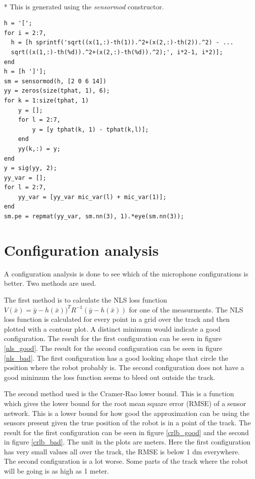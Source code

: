 \documentclass[10pt,a4paper]{report}
\begin{document}
\\*
This is generated using the \emph{sensormod} constructor.
\begin{verbatim}
h = '[';
for i = 2:7,
  h = [h sprintf('sqrt((x(1,:)-th(1)).^2+(x(2,:)-th(2)).^2) - ...
  sqrt((x(1,:)-th(%d)).^2+(x(2,:)-th(%d)).^2);', i*2-1, i*2)];
end
h = [h ']'];
sm = sensormod(h, [2 0 6 14])
yy = zeros(size(tphat, 1), 6);
for k = 1:size(tphat, 1)
    y = [];
    for l = 2:7,
        y = [y tphat(k, 1) - tphat(k,l)];
    end
    yy(k,:) = y;
end
y = sig(yy, 2);
yy_var = [];
for l = 2:7,
    yy_var = [yy_var mic_var(l) + mic_var(1)];
end
sm.pe = repmat(yy_var, sm.nn(3), 1).*eye(sm.nn(3));
\end{verbatim}



\newpage
\section{Configuration analysis}
\label{Configuration analysis}
A configuration analysis is done to see which of the microphone configurations is better.
Two methods are used.

The first method is to calculate the NLS loss function $V(\bar{x}) = \bar{y} - h(\bar{x}))^TR^{-1}(\bar{y} - h(\bar{x}))$ for one of the measurments.
The NLS loss function is calculated for every point in a grid over the track and then plotted with a contour plot.
A distinct minimum would indicate a good configuration.
The result for the first configuration can be seen in figure \ref{nls_good}.
The result for the second configuration can be seen in figure \ref{nls_bad}.
The first configuration has a good looking shape that circle the position where the robot probably is.
The second configuration does not have a good minimum the loss function seems to bleed out outside the track.

The second method used is the Cramer-Rao lower bound. This is a function which gives the lower bound for the root mean square error (RMSE) of a sensor network.
This is a lower bound for how good the approximation can be using the sensors present given the true position of the robot is in a point of the track.
The result for the first configuration can be seen in figure \ref{crlb_good} and the second in figure \ref{crlb_bad}.
The unit in the plots are meters.
Here the first configuration has very small values all over the track, the RMSE is below 1 dm everywhere.
The second configuration is a lot worse. Some parts of the track where the robot will be going is as high as 1 meter.
\end{document}
